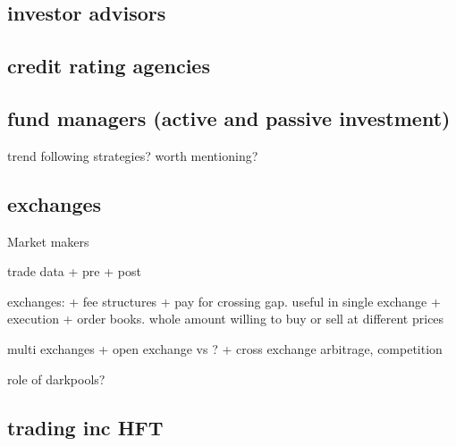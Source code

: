 \subsection{investor advisors}
\subsection{credit rating agencies}
\subsection{fund managers (active and passive investment)}
trend following strategies? worth mentioning?
\subsection{exchanges}
Market makers

trade data
+ pre
+ post

exchanges:
+ fee structures
+ pay for crossing gap. useful in single exchange
+ execution
+ order books. whole amount willing to buy or sell at different prices

multi exchanges
+ open exchange vs ?
+ cross exchange arbitrage, competition

role of darkpools?

\subsection{trading inc HFT}

